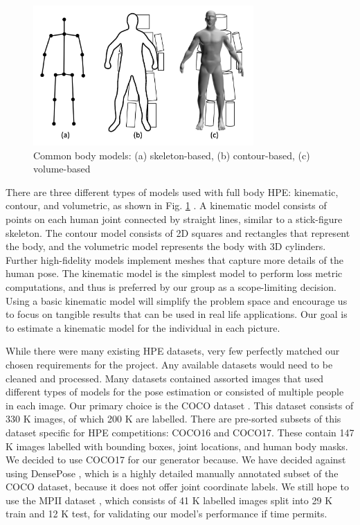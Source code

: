 \documentclass[11pt, letterpaper]{article}
\begin{document}
\begin{figure}
    \centering
    \includegraphics[width=0.75\textwidth]{body_models.png}
    \caption{Common body models: (a) skeleton-based, (b) contour-based, (c) volume-based \cite{Chen_2020}}
    \label{fig:body_model}
\end{figure}

There are three different types of models used with full body HPE: kinematic, contour, and volumetric, as shown in Fig. \ref{fig:body_model} \cite{Chen_2020}. A kinematic model consists of points on each human joint connected by straight lines, similar to a stick-figure skeleton. The contour model consists of 2D squares and rectangles that represent the body, and the volumetric model represents the body with 3D cylinders. Further high-fidelity models implement meshes that capture more details of the human pose. The kinematic model is the simplest model to perform loss metric computations, and thus is preferred by our group as a scope-limiting decision. Using a basic kinematic model will simplify the problem space and encourage us to focus on tangible results that can be used in real life applications. Our goal is to estimate a kinematic model for the individual in each picture.

While there were many existing HPE datasets, very few perfectly matched our chosen requirements for the project. Any available datasets would need to be cleaned and processed. Many datasets contained assorted images that used different types of models for the pose estimation or consisted of multiple people in each image. Our primary choice is the COCO dataset \cite{coco_data}. This dataset consists of 330 K images, of which 200 K are labelled. There are pre-sorted subsets of this dataset specific for HPE competitions: COCO16 and COCO17. These contain 147 K images labelled with bounding boxes, joint locations, and human body masks. We decided to use COCO17 for our generator because. We have decided against using DensePose \cite{densepose}, which is a highly detailed manually annotated subset of the COCO dataset, because it does not offer joint coordinate labels. We still hope to use the MPII dataset \cite{mpii}, which consists of 41 K labelled images split into 29 K train and 12 K test, for validating our model’s performance if time permits. 
\end{document}
